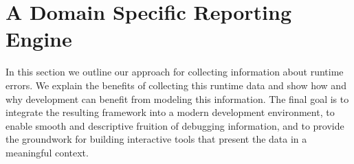 %
%
%
%


\section{A Domain Specific Reporting Engine} \label{sec:reified-framework}

In this section we outline our approach for collecting information about runtime errors.
We explain the benefits of collecting this runtime data and show how and why development can benefit from modeling this information.
The final goal is to integrate the resulting framework into a modern development environment, to enable smooth and descriptive fruition of debugging information, and to provide the groundwork for building interactive tools that present the data in a meaningful context.

